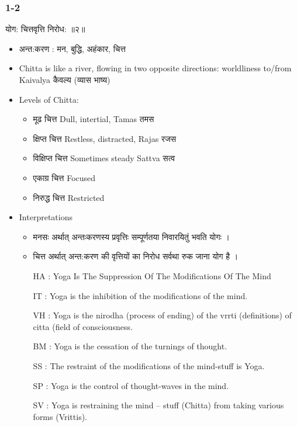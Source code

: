 \begin{frame}[fragile]\frametitle{1-2}

\begin{sanskrit}
योग: चित्तवृत्ति निरोध:  ॥२॥
\end{sanskrit}

	\begin{itemize}
	\item अन्त:करण : मन, बुद्धि, अहंकार, चित्त
	\item Chitta is like a river, flowing in two opposite directions: worldliness to/from Kaivalya कैवल्य (व्यास भाष्य)
	\item Levels of Chitta:
		\begin{itemize}
		\item मूढ चित्त  Dull, intertial, Tamas तमस
		\item क्षिप्त चित्त  Restless, distracted, Rajas  रजस
		\item विक्षिप्त चित्त Sometimes steady Sattva सत्व
		\item एकाग्र चित्त Focused
		\item निरुद्ध चित्त Restricted
		\end{itemize}
	\item Interpretations
		\begin{itemize}		
		\item  मनसः अर्थात् अन्तःकरणस्य प्रवृत्तिः सम्पूर्णतया निवारयितुं भवति योगः ।
		\item चित्त अर्थात् अन्त:करण की वृत्तियों का निरोध सर्वथा रुक जाना योग है ।
		\item [HA]: Yoga Is The Suppression Of The Modifications Of The Mind
		\item [IT]: Yoga is the inhibition of the modifications of the mind.
		\item [VH]: Yoga is the nirodha (process of ending) of the vrrti (definitions) of citta (field of consciousness.
		\item [BM]: Yoga is the cessation of the turnings of thought.
		\item [SS]: The restraint of the modifications of the mind-stuff is Yoga.
		\item [SP]: Yoga is the control of thought-waves in the mind.
		\item [SV]: Yoga is restraining the mind – stuff (Chitta) from taking various forms (Vrittis).
		\end{itemize}
	\end{itemize}

\end{frame}

